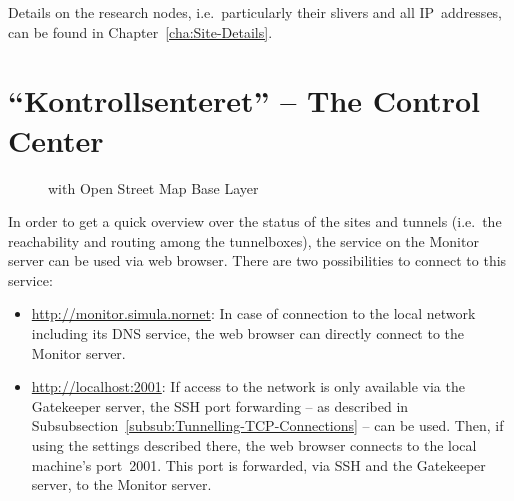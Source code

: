 Details on the research nodes, i.e.\ particularly their slivers and all IP~addresses, can be found in Chapter~\ref{cha:Site-Details}.



\section{``Kontrollsenteret'' -- The Control Center}
\label{sec:Kontrollsenteret}

\begin{figure*}
\begin{center}
\end{center}
\caption{ with Open Street Map Base Layer}
\label{cap:Kontrollsenteret-Site-Information}
\end{figure*}

In order to get a quick overview over the status of the sites and tunnels (i.e.\ the reachability and routing among the tunnelboxes), the  service on the Monitor server can be used via web browser. There are two possibilities to connect to this service:
\begin{itemize}
 \item \url{http://monitor.simula.nornet}:
 In case of connection to the local  network including its DNS service, the web browser can directly connect to the Monitor server.
 
 \item \url{http://localhost:2001}:
 If access to the  network is only available via the Gatekeeper server, the SSH port forwarding -- as described in Subsubsection~\ref{subsub:Tunnelling-TCP-Connections} -- can be used. Then, if using the settings described there, the web browser connects to the local machine's port~2001. This port is forwarded, via SSH and the Gatekeeper server, to the Monitor server.
\end{itemize}

